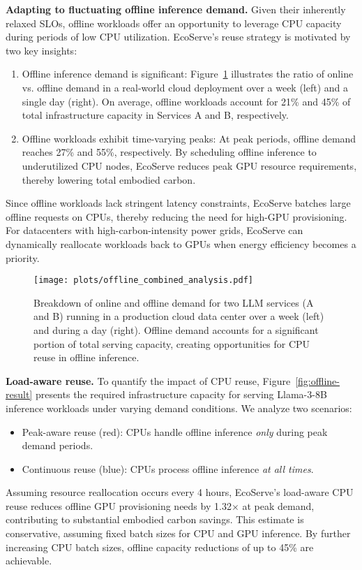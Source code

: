 \textbf{Adapting to fluctuating offline inference demand.}
Given their inherently relaxed SLOs, offline workloads offer an opportunity to leverage {CPU capacity during periods of low CPU utilization}.
EcoServe's reuse strategy is motivated by two key insights:
\begin{enumerate}
    \item {Offline inference demand is significant}: Figure~\ref{fig:offline} illustrates the ratio of online vs. offline demand in a real-world cloud deployment over a week (left) and a single day (right). On average, {offline workloads account for 21\% and 45\% of total infrastructure capacity} in Services A and B, respectively.
    \item {Offline workloads exhibit time-varying peaks}: At peak periods, offline demand reaches {27\% and 55\%}, respectively. By {scheduling offline inference to underutilized CPU nodes}, EcoServe {reduces peak GPU resource requirements}, thereby lowering total embodied carbon.
\end{enumerate}
Since offline workloads lack stringent latency constraints, EcoServe {batches large offline requests} on CPUs, thereby reducing the need for high-GPU provisioning.
For datacenters with high-carbon-intensity power grids, EcoServe can {dynamically reallocate workloads} back to GPUs when energy efficiency becomes a priority.

\begin{figure}[h]
    \centering
    \texttt{[image: plots/offline\_combined\_analysis.pdf]}
    \vspace{-0.2in}
    \caption{Breakdown of online and offline demand for two LLM services (A and B) running in a production cloud data center over a week (left) and during a day (right). 
    Offline demand accounts for a significant portion of total serving capacity, creating opportunities for CPU reuse in offline inference.}
    \label{fig:offline}
    \vspace{-1.2em}
\end{figure}

\textbf{Load-aware reuse.}
To quantify the impact of CPU reuse, Figure~\ref{fig:offline-result} presents the required infrastructure capacity for serving Llama-3-8B inference workloads under varying demand conditions.  
We analyze two scenarios:
\begin{itemize}
    \item {Peak-aware reuse (red):} CPUs handle offline inference \textit{only} during peak demand periods.
    \item {Continuous reuse (blue):} CPUs process offline inference \textit{at all times}.
\end{itemize}
Assuming resource reallocation occurs every {4 hours, EcoServe’s load-aware CPU reuse reduces offline GPU provisioning needs by {1.32$\times$ at peak demand}, contributing to substantial {embodied carbon savings}.
This estimate is {conservative}, assuming fixed batch sizes for CPU and GPU inference. By further increasing CPU batch sizes, offline capacity reductions of up to 45\% are achievable.}

